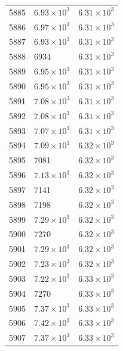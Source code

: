 \begin{table}[H]
\begin{tabular}{lll}
5885 & $\displaystyle 6.93 \times 10^{3}$ & $\displaystyle 6.31 \times 10^{3}$ \\
5886 & $\displaystyle 6.97 \times 10^{3}$ & $\displaystyle 6.31 \times 10^{3}$ \\
5887 & $\displaystyle 6.93 \times 10^{3}$ & $\displaystyle 6.31 \times 10^{3}$ \\
5888 & 6934 & $\displaystyle 6.31 \times 10^{3}$ \\
5889 & $\displaystyle 6.95 \times 10^{3}$ & $\displaystyle 6.31 \times 10^{3}$ \\
5890 & $\displaystyle 6.95 \times 10^{3}$ & $\displaystyle 6.31 \times 10^{3}$ \\
5891 & $\displaystyle 7.08 \times 10^{3}$ & $\displaystyle 6.31 \times 10^{3}$ \\
5892 & $\displaystyle 7.08 \times 10^{3}$ & $\displaystyle 6.31 \times 10^{3}$ \\
5893 & $\displaystyle 7.07 \times 10^{3}$ & $\displaystyle 6.31 \times 10^{3}$ \\
5894 & $\displaystyle 7.09 \times 10^{3}$ & $\displaystyle 6.32 \times 10^{3}$ \\
5895 & 7081 & $\displaystyle 6.32 \times 10^{3}$ \\
5896 & $\displaystyle 7.13 \times 10^{3}$ & $\displaystyle 6.32 \times 10^{3}$ \\
5897 & 7141 & $\displaystyle 6.32 \times 10^{3}$ \\
5898 & 7198 & $\displaystyle 6.32 \times 10^{3}$ \\
5899 & $\displaystyle 7.29 \times 10^{3}$ & $\displaystyle 6.32 \times 10^{3}$ \\
5900 & 7270 & $\displaystyle 6.32 \times 10^{3}$ \\
5901 & $\displaystyle 7.29 \times 10^{3}$ & $\displaystyle 6.32 \times 10^{3}$ \\
5902 & $\displaystyle 7.23 \times 10^{3}$ & $\displaystyle 6.32 \times 10^{3}$ \\
5903 & $\displaystyle 7.22 \times 10^{3}$ & $\displaystyle 6.33 \times 10^{3}$ \\
5904 & 7270 & $\displaystyle 6.33 \times 10^{3}$ \\
5905 & $\displaystyle 7.37 \times 10^{3}$ & $\displaystyle 6.33 \times 10^{3}$ \\
5906 & $\displaystyle 7.42 \times 10^{3}$ & $\displaystyle 6.33 \times 10^{3}$ \\
5907 & $\displaystyle 7.37 \times 10^{3}$ & $\displaystyle 6.33 \times 10^{3}$ \\

\end{tabular}
\end{table}
